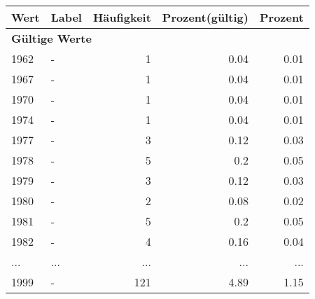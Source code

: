      \begin{longtable}{lXrrr}
     \toprule
     \textbf{Wert} & \textbf{Label} & \textbf{Häufigkeit} & \textbf{Prozent(gültig)} & \textbf{Prozent} \\
     \endhead
     \midrule
     \multicolumn{5}{l}{\textbf{Gültige Werte}}\\
        1962 & \multicolumn{1}{X}{-} & %
          \num{1} &
          \num[round-mode=places,round-precision=2]{0.04} &
          \num[round-mode=places,round-precision=2]{0.01} \\
        1967 & \multicolumn{1}{X}{-} & %
          \num{1} &
          \num[round-mode=places,round-precision=2]{0.04} &
          \num[round-mode=places,round-precision=2]{0.01} \\
        1970 & \multicolumn{1}{X}{-} & %
          \num{1} &
          \num[round-mode=places,round-precision=2]{0.04} &
          \num[round-mode=places,round-precision=2]{0.01} \\
        1974 & \multicolumn{1}{X}{-} & %
          \num{1} &
          \num[round-mode=places,round-precision=2]{0.04} &
          \num[round-mode=places,round-precision=2]{0.01} \\
        1977 & \multicolumn{1}{X}{-} & %
          \num{3} &
          \num[round-mode=places,round-precision=2]{0.12} &
          \num[round-mode=places,round-precision=2]{0.03} \\
        1978 & \multicolumn{1}{X}{-} & %
          \num{5} &
          \num[round-mode=places,round-precision=2]{0.2} &
          \num[round-mode=places,round-precision=2]{0.05} \\
        1979 & \multicolumn{1}{X}{-} & %
          \num{3} &
          \num[round-mode=places,round-precision=2]{0.12} &
          \num[round-mode=places,round-precision=2]{0.03} \\
        1980 & \multicolumn{1}{X}{-} & %
          \num{2} &
          \num[round-mode=places,round-precision=2]{0.08} &
          \num[round-mode=places,round-precision=2]{0.02} \\
        1981 & \multicolumn{1}{X}{-} & %
          \num{5} &
          \num[round-mode=places,round-precision=2]{0.2} &
          \num[round-mode=places,round-precision=2]{0.05} \\
        1982 & \multicolumn{1}{X}{-} & %
          \num{4} &
          \num[round-mode=places,round-precision=2]{0.16} &
          \num[round-mode=places,round-precision=2]{0.04} \\
       ... & ... & ... & ... & ... \\
        1999 & \multicolumn{1}{X}{-} & %
          \num{121} &
          \num[round-mode=places,round-precision=2]{4.89} &
          \num[round-mode=places,round-precision=2]{1.15} \\


\end{longtable}
